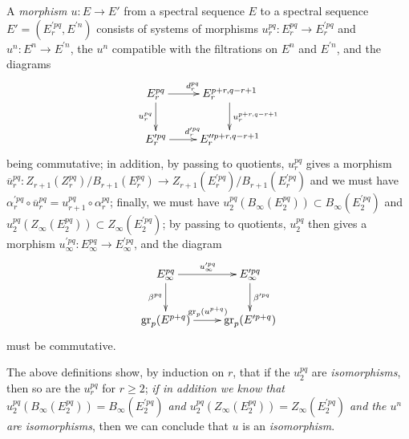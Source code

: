 \begin{env}[11.1.2]
\label{0.11.1.2}
A \emph{morphism $u:E\to E'$} from a spectral sequence $E$ to a spectral sequence $E'=(E_r^{\prime pq},E^{\prime n})$ consists of systems of morphisms $u_r^{pq}:E_r^{pq}\to E_r^{\prime pq}$ and $u^n:E^n\to E^{\prime n}$, the $u^n$ compatible with the filtrations on $E^n$ and $E^{\prime n}$, and the diagrams
\[
  \xymatrix{
    E_r^{pq}\ar[r]^{d_r^{pq}}\ar[d]_{u_r^{pq}} &
    E_r^{p+r,q-r+1}\ar[d]^{u_r^{p+r,q-r+1}}\\
    E_r^{\prime pq}\ar[r]^{d_r^{\prime pq}} &
    E_r'^{\prime p+r,q-r+1}
  }
\]
being commutative; in addition, by passing to quotients, $u_r^{pq}$ gives a morphism $\overline{u}_r^{pq}:Z_{r+1}(Z_r^{pq})/B_{r+1}(E_r^{pq})\to Z_{r+1}(E_r^{\prime pq})/B_{r+1}(E_r^{\prime pq})$ and we must have $\alpha_r^{\prime pq}\circ\overline{u}_r^{pq}=u_{r+1}^{pq}\circ\alpha_r^{pq}$; finally, we must have $u_2^{pq}(B_\infty(E_2^{pq}))\subset B_\infty(E_2^{\prime pq})$ and $u_2^{pq}(Z_\infty(E_2^{pq}))\subset Z_\infty(E_2^{\prime pq})$; by passing to quotients, $u_2^{pq}$ then gives a morphism $u_\infty^{\prime pq}:E_\infty^{pq}\to E_\infty^{\prime pq}$, and the diagram
\[
  \xymatrix{
    E_\infty^{pq}\ar[r]^{u_\infty^{\prime pq}}\ar[d]_{\beta^{pq}} &
    E_\infty^{\prime pq}\ar[d]^{\beta^{\prime pq}}\\
    \gr_p(E^{p+q})\ar[r]^{\gr_p(u^{p+q})} &
    \gr_p(E^{\prime p+q})
  }
\]
must be commutative.

The above definitions show, by induction on $r$, that if the $u_2^{pq}$ are \emph{isomorphisms}, then so are the $u_r^{pq}$ for $r\geqslant 2$; \emph{if in addition we know that $u_2^{pq}(B_\infty(E_2^{pq}))=B_\infty(E_2^{\prime pq})$ and $u_2^{pq}(Z_\infty(E_2^{pq}))=Z_\infty(E_2^{\prime pq})$ and the $u^n$ are isomorphisms}, then we can conclude that $u$ is an \emph{isomorphism}.
\end{env}

